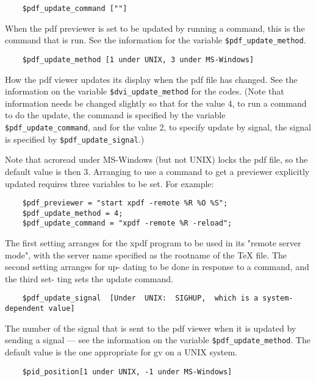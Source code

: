 \begin{verbatim}
	$pdf_update_command [""]
\end{verbatim}

When  the  pdf  previewer is set to be updated by running a command, this is
the command that is run.  See the information  for the variable
\verb|$pdf_update_method|.

\begin{verbatim}
	$pdf_update_method [1 under UNIX, 3 under MS-Windows]
\end{verbatim}

How  the  pdf  viewer  updates its display when the pdf file has
changed. See the information on the variable  \verb|$dvi_update_method|
for the codes.  (Note that information needs be changed slightly
so that for the value 4, to run a command to do the update,  the
command  is  specified  by the variable \verb|$pdf_update_command|, and
for the value 2, to specify update  by  signal,  the  signal  is
specified by \verb|$pdf_update_signal|.)

Note that acroread under MS-Windows (but not UNIX) locks the pdf
file, so the default value is then 3.
Arranging to use a command to get a previewer explicitly updated
requires three variables to be set.  For example:

\begin{verbatim}
	$pdf_previewer = "start xpdf -remote %R %O %S";
	$pdf_update_method = 4;
	$pdf_update_command = "xpdf -remote %R -reload";
\end{verbatim}

The  first  setting  arranges for the xpdf program to be used in
its "remote server mode", with the server name specified as  the
rootname  of  the TeX file.  The second setting arranges for up-
dating to be done in response to a command, and the  third  set-
ting sets the update command.

\begin{verbatim}
	$pdf_update_signal  [Under  UNIX:  SIGHUP,  which is a system-dependent value]
\end{verbatim}

The number of the signal that is sent to the pdf viewer when  it
is  updated  by  sending  a signal --- see the information on the variable
\verb|$pdf_update_method|.  The default value is the  one  appropriate for gv
on a UNIX system.

\begin{verbatim}
	$pid_position[1 under UNIX, -1 under MS-Windows]
\end{verbatim}

